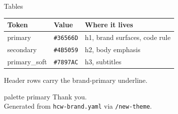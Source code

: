 \documentclass[11pt,aspectratio=169]{beamer}
\begin{document}
\begin{frame}{Tables}
  \begin{tabular}{lll}
    \hline
    \textbf{\color{BrandPrimary}Token} & \textbf{\color{BrandPrimary}Value} & \textbf{\color{BrandPrimary}Where it lives} \\
    \hline
    primary       & \texttt{\#36566D} & h1, brand surfaces, code rule \\
    secondary     & \texttt{\#4B5059} & h2, body emphasis             \\
    primary\_soft & \texttt{\#7897AC} & h3, subtitles                 \\
    \hline
  \end{tabular}

  \vspace{1em}
  Header rows carry the brand-primary underline.
\end{frame}

\begin{frame}
  \begin{beamercolorbox}[wd=\paperwidth,ht=\paperheight,center,sep=2em]{palette primary}
    Thank you.\\[0.5em]
    \small Generated from \texttt{hcw-brand.yaml} via \texttt{/new-theme}.
  \end{beamercolorbox}
\end{frame}
\end{document}
